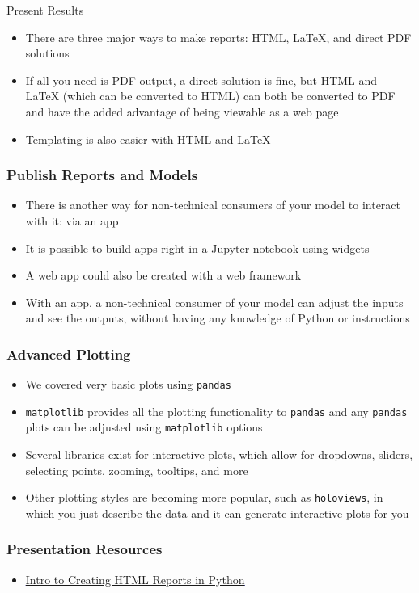 \documentclass[handout, 11pt]{beamer}
\begin{document}
\begin{section}{Present Results}
\begin{frame}
\begin{itemize}
\item There are three major ways to make reports: HTML, LaTeX, and direct PDF solutions
\vfill
\item If all you need is PDF output, a direct solution is fine, but HTML and LaTeX (which can be converted to HTML) can both be converted to PDF and have the added advantage of being viewable as a web page
\vfill
\item Templating is also easier with HTML and LaTeX
\end{itemize}
\end{frame}
\begin{frame}
\frametitle{Publish Reports and Models}
\begin{itemize}
\item There is another way for non-technical consumers of your model to interact with it: via an app
\vfill
\item It is possible to build apps right in a Jupyter notebook using widgets
\vfill
\item A web app could also be created with a web framework
\vfill
\item With an app, a non-technical consumer of your model can adjust the inputs and see the outputs, without having any knowledge of Python or instructions
\end{itemize}
\end{frame}
\begin{frame}
\frametitle{Advanced Plotting}
\begin{itemize}
\item We covered very basic plots using
\texttt{pandas}
\vfill
\item \texttt{matplotlib}
provides all the plotting functionality to
\texttt{pandas}
and any
\texttt{pandas}
plots can be adjusted using
\texttt{matplotlib}
options
\vfill
\item Several libraries exist for interactive plots, which allow for dropdowns, sliders, selecting points, zooming, tooltips, and more
\vfill
\item Other plotting styles are becoming more popular, such as
\texttt{holoviews},
in which
you just describe the data and it can generate interactive plots for you
\end{itemize}
\end{frame}
\begin{frame}
\frametitle{Presentation Resources}
\begin{itemize}
\small
\vfill
\item \textcolor{blue}{\underline{\href{https://dev.to/goyder/automatic-reporting-in-python---part-1-from-planning-to-hello-world-32n1}{Intro to Creating HTML Reports in Python}}}

\end{itemize}
\end{frame}
\end{section}
\end{document}
